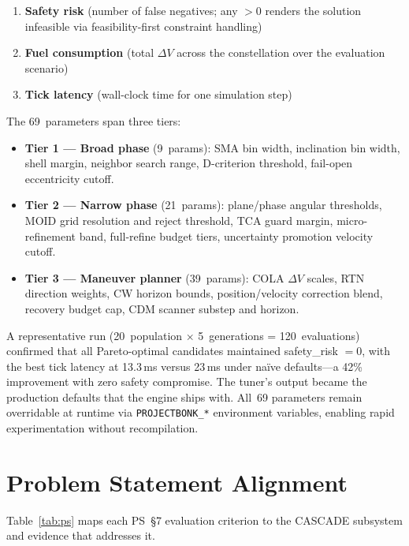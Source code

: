 \documentclass[10pt,twocolumn,letterpaper]{article}
\begin{document}
\begin{enumerate}[nosep,leftmargin=*]
  \item \textbf{Safety risk} (number of false negatives; any $>0$ renders
    the solution infeasible via feasibility-first constraint handling)
  \item \textbf{Fuel consumption} (total $\Delta V$ across the
    constellation over the evaluation scenario)
  \item \textbf{Tick latency} (wall-clock time for one simulation step)
\end{enumerate}

\noindent
The 69~parameters span three tiers:

\begin{itemize}[nosep,leftmargin=*]
  \item \textbf{Tier 1 --- Broad phase} (9~params): SMA bin width,
    inclination bin width, shell margin, neighbor search range,
    D-criterion threshold, fail-open eccentricity cutoff.
  \item \textbf{Tier 2 --- Narrow phase} (21~params): plane/phase
    angular thresholds, MOID grid resolution and reject threshold,
    TCA guard margin, micro-refinement band, full-refine budget
    tiers, uncertainty promotion velocity cutoff.
  \item \textbf{Tier 3 --- Maneuver planner} (39~params): COLA
    $\Delta V$ scales, RTN direction weights, CW horizon bounds,
    position/velocity correction blend, recovery budget cap,
    CDM scanner substep and horizon.
\end{itemize}

\noindent
A representative run (20~population $\times$ 5~generations =
120~evaluations) confirmed that all Pareto-optimal candidates maintained
safety\_risk $= 0$, with the best tick latency at 13.3\,ms versus 23\,ms
under na\"ive defaults---a 42\% improvement with zero safety compromise.
The tuner's output became the production defaults that the engine ships
with.  All~69 parameters remain overridable at runtime via
\texttt{PROJECTBONK\_*} environment variables, enabling rapid
experimentation without recompilation.

\section{Problem Statement Alignment}\label{app:ps}

Table~\ref{tab:ps} maps each PS~\S7 evaluation criterion to the
CASCADE subsystem and evidence that addresses it.
\end{document}
